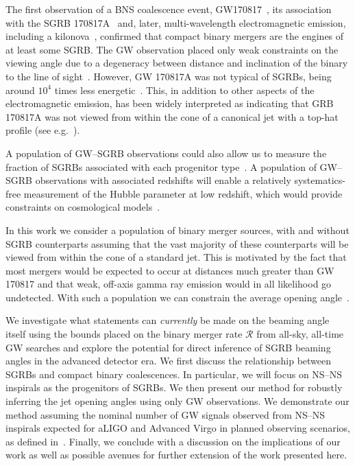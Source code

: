 \documentclass[twocolumn,nofootinbib]{revtex4-1}
\newcommand{\cbcrate}{{{\mathcal R}}}
\newcommand{\BNS}{\ac{NS}--\ac{NS}\xspace}
\newcommand{\JOINT}{\ac{GW}--\ac{SGRB}\xspace}
\begin{document}
The first observation of a \ac{BNS} coalescence event,
GW170817~\cite{TheLIGOScientific:2017qsa}, its association with the
\ac{SGRB} 170817A~\cite{Monitor:2017mdv,Goldstein:2017mmi,Savchenko:2017ffs}
and, later, multi-wavelength electromagnetic emission, including a
kilonova~\cite{2017ApJ...848L..12A}, confirmed that compact binary mergers are
the engines of at least some \ac{SGRB}. The \ac{GW} observation placed only
weak constraints on the viewing angle due to a degeneracy between distance and
inclination of the binary to the line of sight~\cite{TheLIGOScientific:2017qsa}.
However, GW 170817A was not typical of \acp{SGRB}, being around $10^{4}$ times
less energetic~\cite{Goldstein:2017mmi}. This, in addition to other aspects of
the electromagnetic emission, has been widely interpreted as indicating that
GRB 170817A was not viewed from within the cone of a canonical jet with a
top-hat profile (see
e.g.~\cite{Fong:2017ekk,Kasliwal:2017ngb,Gottlieb:2017pju,Haggard:2017qne}).

A population of \JOINT observations could also allow us to measure the fraction
of \acp{SGRB} associated with each progenitor type~\cite{Kreidberg:2012ud}. A
population of \JOINT observations with associated redshifts will enable a
relatively systematics-free measurement of the Hubble parameter at low redshift,
which would provide constraints on cosmological
models~\cite{Schutz:1986gp,Nissanke:2009kt,Chen:2012qh,Abbott:2017xzu}.

In this work we consider a population of binary merger sources, with and without
\ac{SGRB} counterparts assuming that the vast majority of these counterparts
will be viewed from within the cone of a standard jet. This is motivated by the
fact that most mergers would be expected to occur at distances much greater than
GW 170817 and that weak, off-axis gamma ray emission would in all likelihood go
undetected. With such a population we can constrain the average opening
angle~\cite{Clark:2014jpa}.

We investigate what statements can \emph{currently} be made on the beaming angle
itself using the bounds placed on the binary merger rate $\cbcrate$ from
all-sky, all-time \ac{GW} searches and explore the potential for direct
inference of \ac{SGRB} beaming angles in the advanced detector era.
We first discuss the relationship between \acp{SGRB} and compact binary
coalescences. In particular, we will focus on \BNS inspirals as the progenitors
of \acp{SGRB}. We then present our method for robustly inferring the jet opening
angles using only \ac{GW} observations. We demonstrate our method assuming the
nominal number of \ac{GW} signals observed from \BNS inspirals expected for
\ac{aLIGO} and Advanced Virgo in planned observing scenarios, as defined
in~\cite{Aasi:2013wya}. Finally, we conclude with a discussion on the
implications of our work as well as possible avenues for further extension of
the work presented here.
\end{document}
